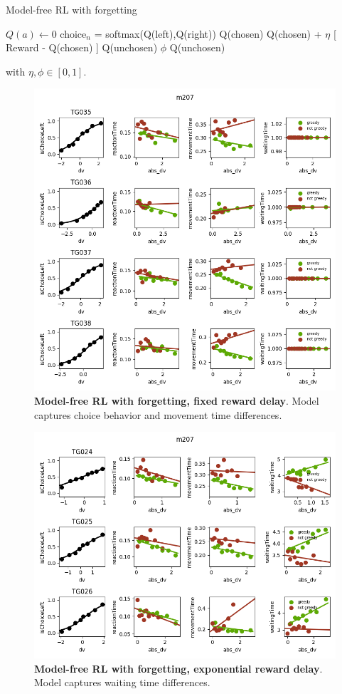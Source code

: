 \begin{algorithm}
\caption{Model-free RL with forgetting}
\begin{algorithmic} 
\STATE $Q(a) \leftarrow 0$
\ENDFOR
{}
\STATE choice$_n$ = softmax(Q(left),Q(right))
\STATE Q(chosen) \leftarrow Q(chosen) + $\eta$ [ Reward - Q(chosen) ]
\STATE Q(unchosen) \leftarrow $\phi$ Q(unchosen)
\ENDWHILE
\end{algorithmic}
\label{alg:mf}
\end{algorithm}
with $\eta, \phi \in [0,1]$.

\begin{figure}[h!]
    \centering
    \includegraphics[width=.8\linewidth]{lauglim/dv_matching_cdda2c5_m207.png}
    \caption{\textbf{Model-free RL with forgetting, fixed reward delay}. Model captures choice behavior and movement time differences.}
    \label{fig:cdda2c5_m207}
\end{figure}

\begin{figure}[h!]
    \centering
    \includegraphics[width=.8\linewidth]{lauglim/dv_matching_conf_m207.png}
    \caption{\textbf{Model-free RL with forgetting, exponential reward delay}. Model captures waiting time differences.}
    \label{fig:cdda2c5_m207}
\end{figure}


